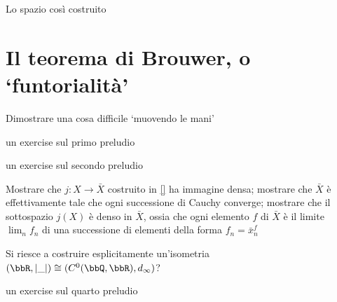 Lo spazio così costruito
\section*{Il teorema di Brouwer, o `funtorialità'}
Dimostrare una cosa difficile `muovendo le mani'
\begin{exercises}
\item \label{ex_prelude_1} un exercise sul primo preludio
\item \label{ex_prelude_2} un exercise sul secondo preludio
\item \label{ex_prelude_3} Mostrare che \(j : X\to \bar X\) costruito in \autoref{} ha immagine densa; mostrare che \(\bar X\) è effettivamente tale che ogni successione di Cauchy converge; mostrare che il sottospazio $j(X)$ è denso in $\bar X$, ossia che ogni elemento $f$ di $\bar X$ è il limite $\lim_n f_n$ di una successione di elementi della forma $f_n=\bar x_n^f$

Si riesce a costruire esplicitamente un'isometria \((\bbR, |\_|) \cong (C^0(\bbQ,\bbR), d_\infty)\)?
\item \label{ex_prelude_4} un exercise sul quarto preludio
\end{exercises}